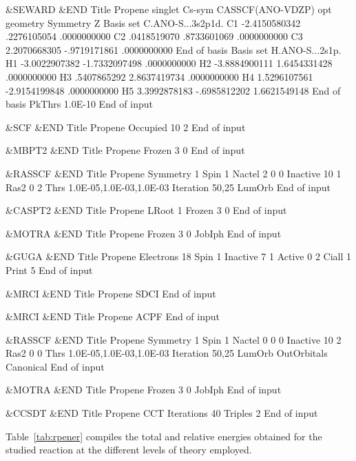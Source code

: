 \begin{inputlisting}
 &SEWARD &END
Title
 Propene singlet Cs-sym
 CASSCF(ANO-VDZP) opt geometry
Symmetry
 Z 
Basis set
C.ANO-S...3s2p1d.
C1            -2.4150580342         .2276105054         .0000000000
C2              .0418519070         .8733601069         .0000000000
C3             2.2070668305        -.9719171861         .0000000000
End of basis
Basis set
H.ANO-S...2s1p.
H1            -3.0022907382       -1.7332097498         .0000000000
H2            -3.8884900111        1.6454331428         .0000000000
H3              .5407865292        2.8637419734         .0000000000
H4             1.5296107561       -2.9154199848         .0000000000
H5             3.3992878183        -.6985812202        1.6621549148
End of basis
PkThrs
 1.0E-10
End of input

 &SCF &END
Title
Propene
Occupied
10 2
End of input
 
 &MBPT2 &END
Title
 Propene
Frozen
 3 0
End of input

 &RASSCF &END
Title
Propene
Symmetry 
1
Spin
1
Nactel
 2  0  0
Inactive
10  1
Ras2  
 0  2
Thrs
1.0E-05,1.0E-03,1.0E-03
Iteration
50,25
LumOrb
End of input

 &CASPT2 &END
Title
Propene
LRoot
1
Frozen
 3  0
End of input

 &MOTRA &END
Title
Propene
Frozen
 3  0
JobIph
End of input

 &GUGA &END
Title
Propene
Electrons
18
Spin
 1
Inactive
 7  1
Active
 0  2
Ciall
 1
Print
 5
End of input

 &MRCI &END
Title
Propene
SDCI
End of input

 &MRCI &END
Title
Propene
ACPF
End of input

 &RASSCF &END
Title
Propene
Symmetry
1
Spin
1
Nactel
 0  0  0
Inactive
10  2
Ras2
 0  0
Thrs
1.0E-05,1.0E-03,1.0E-03
Iteration
50,25
LumOrb
OutOrbitals
 Canonical
End of input

 &MOTRA &END
Title
Propene
Frozen
 3  0
JobIph
End of input

 &CCSDT &END
Title
 Propene
CCT
Iterations
 40
Triples
 2
End of input
\end{inputlisting}

Table~\ref{tab:rpener} compiles the total and relative energies
obtained for the studied reaction at the different levels of
theory employed.


